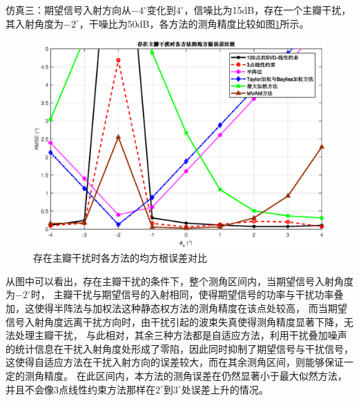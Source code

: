 \documentclass[master]{thesis-uestc}
\begin{document}
仿真三：期望信号入射方向从$-4^\circ$变化到$4^\circ$，信噪比为15dB，存在一个主瓣干扰，
其入射角度为$-2^\circ$，干噪比为50dB，各方法的测角精度比较如图\ref{SVD-JLC_RMSE_MLJ}所示。
\begin{figure}[H]
    \includegraphics[scale=0.5]{pic/SVD-JLC_RMSE_MLJ.eps}
    \caption{存在主瓣干扰时各方法的均方根误差对比}
    \label{SVD-JLC_RMSE_MLJ}
\end{figure}
从图中可以看出，存在主瓣干扰的条件下，整个测角区间内，当期望信号入射角度为$-2^\circ$时，
主瓣干扰与期望信号的入射相同，使得期望信号的功率与干扰功率叠加，这使得半阵法与加权法这种静态权方法的测角精度在该点处较高，
而当期望信号入射角度远离干扰方向时，由干扰引起的波束失真使得测角精度显著下降，无法处理主瓣干扰，
与此相对，其余三种方法都是自适应方法，利用干扰叠加噪声的统计信息在干扰入射角度处形成了零陷，因此同时抑制了期望信号与干扰信号，
这使得自适应方法在干扰入射方向的误差较大，而在其余测角区间，则能够保证一定的测角精度。
在此区间内，本方法的测角误差在仍然显著小于最大似然方法，并且不会像3点线性约束方法那样在$2^\circ$到$3^\circ$处误差上升的情况。
\end{document}
